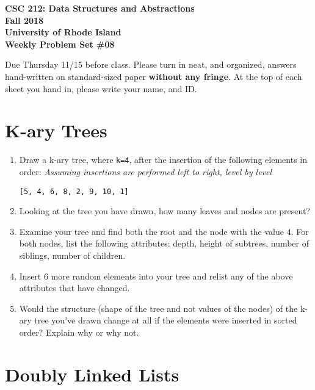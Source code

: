 \documentclass[11pt]{article}
\begin{document}
    \thispagestyle{empty}

    \begin{center}
        {\Large\bf CSC 212: Data Structures and Abstractions}\\
        \medskip
        {\Large\bf Fall 2018}\\
        \medskip
        {\Large\bf University of Rhode Island}\\
        \bigskip
        {\Large\bf Weekly Problem Set \#08}
    \end{center}

    Due Thursday 11/15 before class. Please turn in neat, and organized, answers hand-written on standard-sized paper \textbf{without any fringe}. At the top of each sheet you hand in, please write your name, and ID.

    \section{K-ary Trees}
    \begin{enumerate}
        \item Draw a k-ary tree, where \verb|k=4|, after the insertion of the following elements in order: \emph{Assuming insertions are performed left to right, level by level}

        \verb|[5, 4, 6, 8, 2, 9, 10, 1]|

        \item Looking at the tree you have drawn, how many leaves and nodes are present?

        \item Examine your tree and find both the root and the node with the value 4. For both nodes, list the following attributes: depth, height of subtrees, number of siblings, number of children.

        \item Insert 6 more random elements into your tree and relist any of the above attributes that have changed.

        \item Would the structure (shape of the tree and not values of the nodes) of the k-ary tree you've drawn change at all if the elements were inserted in sorted order? Explain why or why not.
    \end{enumerate}

    \section{Doubly Linked Lists}
\end{document}
